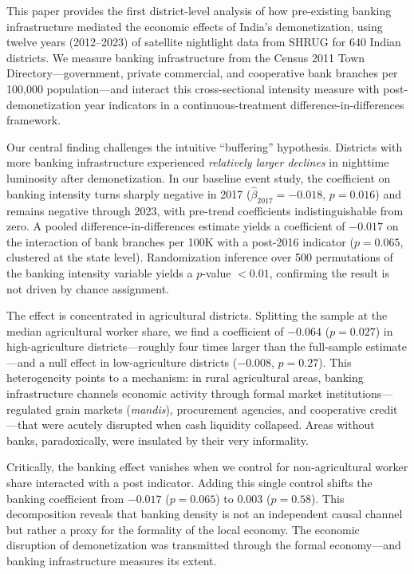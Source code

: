 \documentclass[12pt]{article}
\begin{document}
This paper provides the first district-level analysis of how pre-existing banking infrastructure mediated the economic effects of India's demonetization, using twelve years (2012--2023) of satellite nightlight data from SHRUG for 640 Indian districts. We measure banking infrastructure from the Census 2011 Town Directory---government, private commercial, and cooperative bank branches per 100,000 population---and interact this cross-sectional intensity measure with post-demonetization year indicators in a continuous-treatment difference-in-differences framework.

Our central finding challenges the intuitive ``buffering'' hypothesis. Districts with more banking infrastructure experienced \textit{relatively larger declines} in nighttime luminosity after demonetization. In our baseline event study, the coefficient on banking intensity turns sharply negative in 2017 ($\hat{\beta}_{2017} = -0.018$, $p = 0.016$) and remains negative through 2023, with pre-trend coefficients indistinguishable from zero. A pooled difference-in-differences estimate yields a coefficient of $-0.017$ on the interaction of bank branches per 100K with a post-2016 indicator ($p = 0.065$, clustered at the state level). Randomization inference over 500 permutations of the banking intensity variable yields a $p$-value $< 0.01$, confirming the result is not driven by chance assignment.

The effect is concentrated in agricultural districts. Splitting the sample at the median agricultural worker share, we find a coefficient of $-0.064$ ($p = 0.027$) in high-agriculture districts---roughly four times larger than the full-sample estimate---and a null effect in low-agriculture districts ($-0.008$, $p = 0.27$). This heterogeneity points to a mechanism: in rural agricultural areas, banking infrastructure channels economic activity through formal market institutions---regulated grain markets (\textit{mandis}), procurement agencies, and cooperative credit---that were acutely disrupted when cash liquidity collapsed. Areas without banks, paradoxically, were insulated by their very informality.

Critically, the banking effect vanishes when we control for non-agricultural worker share interacted with a post indicator. Adding this single control shifts the banking coefficient from $-0.017$ ($p = 0.065$) to $0.003$ ($p = 0.58$). This decomposition reveals that banking density is not an independent causal channel but rather a proxy for the formality of the local economy. The economic disruption of demonetization was transmitted through the formal economy---and banking infrastructure measures its extent.
\end{document}
